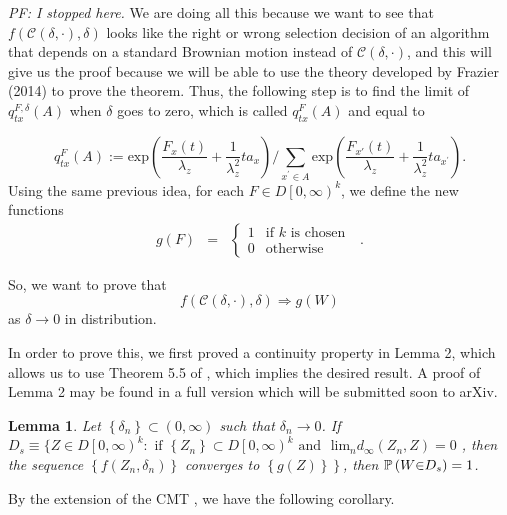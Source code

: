\documentclass{wscpaperproc}
\theoremstyle{wsc}
\newtheorem{lemma}{Lemma}
\begin{document}
{\it PF: I stopped here.}
We are doing all this because we want to see that $f\left(\mathcal{C}\left(\delta,\cdot\right),\delta\right)$
looks like the right or wrong selection decision of an algorithm that
depends on a standard Brownian motion instead of $\mathcal{C}\left(\delta,\cdot\right)$,
and this will give us the proof because we will be able to use the
theory developed by Frazier (2014) to prove the theorem. Thus, the
following step is to find the limit of $q_{tx}^{F,\delta}\left(A\right)$
when $\delta$ goes to zero, which is called $q_{tx}^{F}\left(A\right)$
and equal to

\[
q_{tx}^{F}\left(A\right):=\mbox{exp}\left(\frac{F_{x}\left(t\right)}{\lambda_{z}}+\frac{1}{\lambda_{z}^{2}}ta_{x}\right)/\sum_{x^{'}\in A}\mbox{exp}\left(\frac{F_{x'}\left(t\right)}{\lambda_{z}}+\frac{1}{\lambda_{z}^{2}}ta_{x^{'}}\right).
\]
 Using the same previous idea, for each $F\in D\left[0,\infty\right)^{k}$,
we define the new functions
\[
\]
\begin{eqnarray*}
g\left(F\right) & = & \begin{cases}
1 & \mbox{if }k\mbox{ is chosen}\mbox{ }\\
0 & \mbox{otherwise}
\end{cases}.
\end{eqnarray*}


So, we want to prove that 
\[
f\left(\mathcal{C}\left(\delta,\cdot\right),\delta\right)\Rightarrow g\left(W\right)
\]
as $\delta\rightarrow0$ in distribution.

In order to prove this, we first proved a continuity property in Lemma
2, which allows us to use Theorem 5.5 of , which
implies the desired result. A proof of Lemma 2 may be found in a full version which will be
submitted soon to arXiv. 
\\
\begin{lemma}

Let $\left\{ \delta_{n}\right\} \subset\left(0,\infty\right)$ such
that $\delta_{n}\rightarrow0$. If $D_{s}\equiv\{Z\in D\left[0,\infty\right)^{k}:\mbox{ if }\left\{ Z_{n}\right\} \subset D\left[0,\infty\right)^{k}\mbox{ and }$
$\mbox{lim}{}_{n}d_{\infty}\left(Z_{n},Z\right)=0$ , then the sequence
$\left\{ f\left(Z_{n},\delta_{n}\right)\right\} $ converges to $\left\{ g\left(Z\right)\right\} $$\left.\right\} $$ $,
then $ $$\mathbb{P}\left(W\text{\ensuremath{\in}}D_{s}\right)=1$.


\end{lemma}
\vspace{5mm}
By the extension of the CMT \cite{billingsley:convergence}, we
have the following corollary.
\vspace{5mm}
\end{document}
